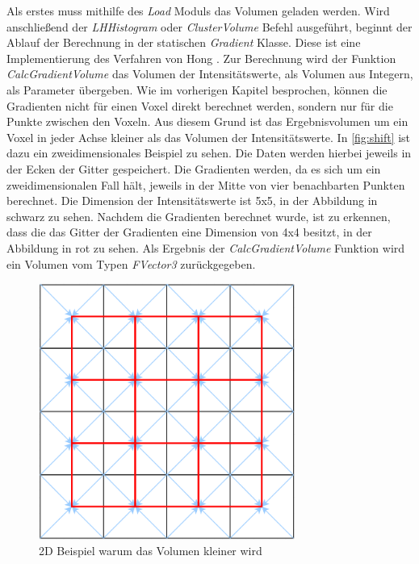 Als erstes muss mithilfe des \textit{Load} Moduls das Volumen geladen werden. Wird anschließend der  \textit{LHHistogram} oder \textit{ClusterVolume} Befehl ausgeführt, beginnt der Ablauf der Berechnung in der statischen \textit{Gradient} Klasse.
\newline
Diese ist eine Implementierung des Verfahren von Hong \cite{hong2003method}. Zur Berechnung wird der Funktion \textit{CalcGradientVolume} das Volumen der Intensitätswerte, als Volumen aus Integern, als Parameter übergeben. Wie im vorherigen Kapitel besprochen, können die Gradienten nicht für einen Voxel direkt berechnet werden, sondern nur für die Punkte zwischen den Voxeln. Aus diesem Grund ist das Ergebnisvolumen um ein Voxel in jeder Achse kleiner als das Volumen der Intensitätswerte.
\newline
In \autoref{fig:shift} ist dazu ein zweidimensionales Beispiel zu sehen. Die Daten werden hierbei jeweils in der Ecken der Gitter gespeichert. Die Gradienten werden, da es sich um ein zweidimensionalen Fall hält, jeweils in der Mitte von vier benachbarten Punkten berechnet. Die Dimension der Intensitätswerte ist 5x5, in der Abbildung in schwarz zu sehen. Nachdem die Gradienten berechnet wurde, ist zu erkennen, dass die das Gitter der Gradienten eine Dimension von 4x4 besitzt, in der Abbildung in rot zu sehen.
\newline
Als Ergebnis der \textit{CalcGradientVolume} Funktion wird ein Volumen vom Typen \textit{FVector3} zurückgegeben.


\begin{figure}
\centering 
\includegraphics[width=0.75\textwidth]{Logos/VoxelShift.png}
\caption{2D Beispiel warum das Volumen kleiner wird} 
\label{fig:shift} 
\end{figure}



